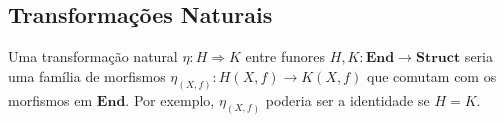 \subsection{Transformações Naturais}

Uma transformação natural $\eta: H \Rightarrow K$ entre funores $H, K: \mathbf{End} \to \mathbf{Struct}$ seria uma família de morfismos $\eta_{(X,f)}: H(X,f) \to K(X,f)$ que comutam com os morfismos em $\mathbf{End}$. Por exemplo, $\eta_{(X,f)}$ poderia ser a identidade se $H = K$.